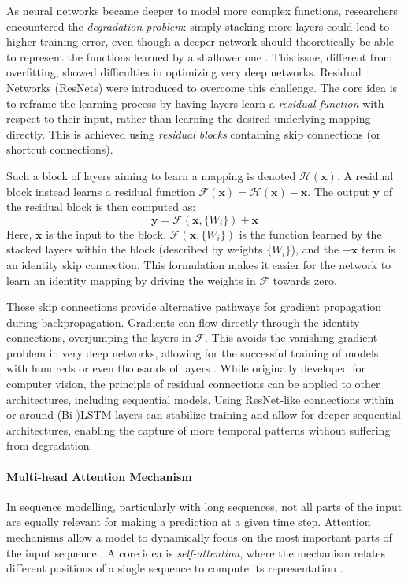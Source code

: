As neural networks became deeper to model more complex functions, researchers encountered the \textit{degradation problem}: simply stacking more layers could lead to higher training error, even though a deeper network should theoretically be able to represent the functions learned by a shallower one \autocite{he2016deep}. This issue, different from overfitting, showed difficulties in optimizing very deep networks. Residual Networks (ResNets) were introduced to overcome this challenge. The core idea is to reframe the learning process by having layers learn a \textit{residual function} with respect to their input, rather than learning the desired underlying mapping directly. This is achieved using \textit{residual blocks} containing skip connections (or shortcut connections).

Such a block of layers aiming to learn a mapping is denoted \( \mathcal{H}(\bm{x}) \). A residual block instead learns a residual function \( \mathcal{F}(\bm{x}) = \mathcal{H}(\bm{x}) - \bm{x} \). The output \( \bm{y} \) of the residual block is then computed as:
\begin{equation}
  \bm{y} = \mathcal{F}(\bm{x}, \{W_i\}) + \bm{x}
  \label{eq:resnet_block}
\end{equation}
Here, \( \bm{x} \) is the input to the block, \( \mathcal{F}(\bm{x}, \{W_i\}) \) is the function learned by the stacked layers within the block (described by weights \( \{W_i\} \)), and the \( +\bm{x} \) term is an identity skip connection. This formulation makes it easier for the network to learn an identity mapping by driving the weights in \( \mathcal{F} \) towards zero.

These skip connections provide alternative pathways for gradient propagation during backpropagation. Gradients can flow directly through the identity connections, overjumping the layers in \( \mathcal{F} \). This avoids the vanishing gradient problem in very deep networks, allowing for the successful training of models with hundreds or even thousands of layers \autocite{he2016deep}. While originally developed for computer vision, the principle of residual connections can be applied to other architectures, including sequential models. Using ResNet-like connections within or around (Bi-)LSTM layers can stabilize training and allow for deeper sequential architectures, enabling the capture of more  temporal patterns without suffering from degradation.

\paragraph{\textbf{Multi-head Attention Mechanism}}
\label{sec:attention}
In sequence modelling, particularly with long sequences, not all parts of the input are equally relevant for making a prediction at a given time step. Attention mechanisms allow a model to dynamically focus on the most important parts of the input sequence \autocite{chorowski2014end}. A core idea is \textit{self-attention}, where the mechanism relates different positions of a single sequence to compute its representation \autocite{vaswani2017attention}.

